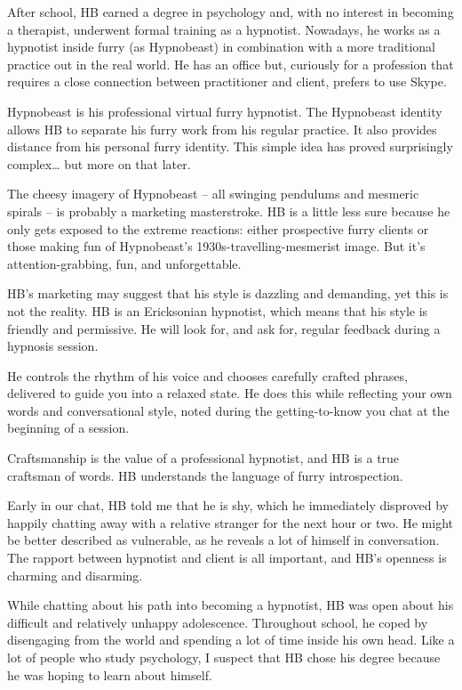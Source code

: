 After school, HB earned a degree in psychology and, with no interest in becoming a therapist, underwent formal training as a hypnotist. Nowadays, he works as a hypnotist inside furry (as Hypnobeast) in combination with a more traditional practice out in the real world. He has an office but, curiously for a profession that requires a close connection between practitioner and client, prefers to use Skype.

Hypnobeast is his professional virtual furry hypnotist. The Hypnobeast identity allows HB to separate his furry work from his regular practice. It also provides distance from his personal furry identity. This simple idea has proved surprisingly complex… but more on that later.

The cheesy imagery of Hypnobeast -- all swinging pendulums and mesmeric spirals -- is probably a marketing masterstroke. HB is a little less sure because he only gets exposed to the extreme reactions: either prospective furry clients or those making fun of Hypnobeast's 1930s-travelling-mesmerist image. But it's attention-grabbing, fun, and unforgettable.

HB's marketing may suggest that his style is dazzling and demanding, yet this is not the reality. HB is an Ericksonian hypnotist, which means that his style is friendly and permissive. He will look for, and ask for, regular feedback during a hypnosis session.

He controls the rhythm of his voice and chooses carefully crafted phrases, delivered to guide you into a relaxed state. He does this while reflecting your own words and conversational style, noted during the getting-to-know you chat at the beginning of a session.

Craftsmanship is the value of a professional hypnotist, and HB is a true craftsman of words. HB understands the language of furry introspection.

Early in our chat, HB told me that he is shy, which he immediately disproved by happily chatting away with a relative stranger for the next hour or two. He might be better described as vulnerable, as he reveals a lot of himself in conversation. The rapport between hypnotist and client is all important, and HB's openness is charming and disarming.

While chatting about his path into becoming a hypnotist, HB was open about his difficult and relatively unhappy adolescence. Throughout school, he coped by disengaging from the world and spending a lot of time inside his own head. Like a lot of people who study psychology, I suspect that HB chose his degree because he was hoping to learn about himself.

